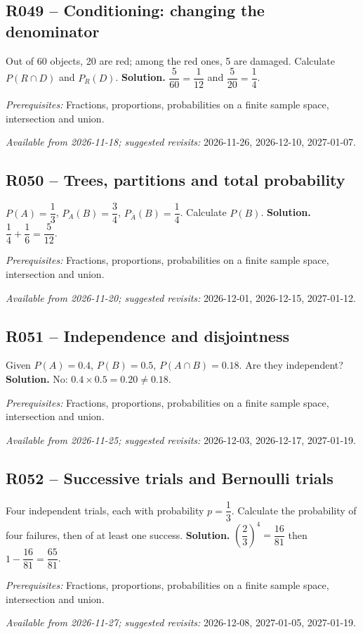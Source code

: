 \subsection*{R049 -- Conditioning: changing the denominator}\label{R049}
Out of 60 objects, 20 are red; among the red ones, 5 are damaged. Calculate $P(R\cap D)$ and $P_R(D)$.
\ifprof\textbf{Solution.} $\dfrac{5}{60}=\dfrac{1}{12}$ and $\dfrac{5}{20}=\dfrac{1}{4}$.\par\textit{Prerequisites:} Fractions, proportions, probabilities on a finite sample space, intersection and union.\par\textit{Available from 2026-11-18; suggested revisits:} 2026-11-26, 2026-12-10, 2027-01-07.\fi
{}\subsection*{R050 -- Trees, partitions and total probability}\label{R050}
$P(A)=\dfrac{1}{3}$, $P_A(B)=\dfrac{3}{4}$, $P_{\overline A}(B)=\dfrac{1}{4}$. Calculate $P(B)$.
\ifprof\textbf{Solution.} $\dfrac{1}{4}+\dfrac{1}{6}=\dfrac{5}{12}$.\par\textit{Prerequisites:} Fractions, proportions, probabilities on a finite sample space, intersection and union.\par\textit{Available from 2026-11-20; suggested revisits:} 2026-12-01, 2026-12-15, 2027-01-12.\fi
{}\subsection*{R051 -- Independence and disjointness}\label{R051}
Given $P(A)=0.4$, $P(B)=0.5$, $P(A\cap B)=0.18$. Are they independent?
\ifprof\textbf{Solution.} No: $0.4\times0.5=0.20\ne0.18$.\par\textit{Prerequisites:} Fractions, proportions, probabilities on a finite sample space, intersection and union.\par\textit{Available from 2026-11-25; suggested revisits:} 2026-12-03, 2026-12-17, 2027-01-19.\fi
{}\subsection*{R052 -- Successive trials and Bernoulli trials}\label{R052}
Four independent trials, each with probability $p=\dfrac{1}{3}$. Calculate the probability of four failures, then of at least one success.
\ifprof\textbf{Solution.} $(\dfrac{2}{3})^4=\dfrac{16}{81}$ then $1-\dfrac{16}{81}=\dfrac{65}{81}$.\par\textit{Prerequisites:} Fractions, proportions, probabilities on a finite sample space, intersection and union.\par\textit{Available from 2026-11-27; suggested revisits:} 2026-12-08, 2027-01-05, 2027-01-19.\fi
